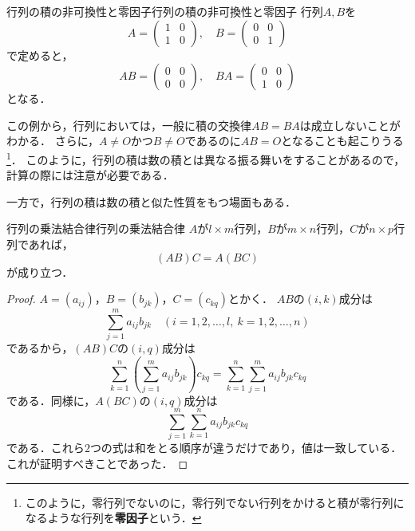 \begin{example}{行列の積の非可換性と零因子}{行列の積の非可換性と零因子}
  行列$A,B$を
  \[
    A = \begin{pmatrix} 1 & 0 \\ 1 & 0 \end{pmatrix}, \quad
    B = \begin{pmatrix} 0 & 0 \\ 0 & 1 \end{pmatrix}
  \]
  で定めると，
  \[
    AB = \begin{pmatrix} 0 & 0 \\ 0 & 0 \end{pmatrix}, \quad
    BA = \begin{pmatrix} 0 & 0 \\ 1 & 0 \end{pmatrix}
  \]
  となる．
\end{example}

この例から，行列においては，一般に積の交換律$AB = BA$は成立しないことがわかる．
さらに，$A \ne O$かつ$B \ne O$であるのに$AB = O$となることも起こりうる\footnote{このように，零行列でないのに，零行列でない行列をかけると積が零行列になるような行列を\textbf{零因子}という．}．
このように，行列の積は数の積とは異なる振る舞いをすることがあるので，計算の際には注意が必要である．

一方で，行列の積は数の積と似た性質をもつ場面もある．

\begin{prop}{行列の乗法結合律}{行列の乗法結合律}
  $A$が$l \times m$行列，$B$が$m \times n$行列，$C$が$n \times p$行列であれば，
  \[
    (AB)C = A(BC)
  \]
  が成り立つ．
\end{prop}

\begin{tleftbar}
\begin{proof}
  $A = (a_{ij})$，$B = (b_{jk})$，$C = (c_{kq})$とかく．
  $AB$の$(i, k)$成分は
  \[
    \sum_{j=1}^{m} a_{ij} b_{jk}
    \quad (i = 1, 2, \dots, l,~ k = 1, 2, \dots, n)
  \]
  であるから，$(AB)C$の$(i, q)$成分は
  \[
    \sum_{k=1}^{n} \left( \sum_{j=1}^{m} a_{ij} b_{jk} \right) c_{kq}
    = \sum_{k=1}^{n} \sum_{j=1}^{m} a_{ij} b_{jk} c_{kq}
  \]
  である．同様に，$A(BC)$の$(i, q)$成分は
  \[
    \sum_{j=1}^{m} \sum_{k=1}^{n} a_{ij} b_{jk} c_{kq}
  \]
  である．これら$2$つの式は和をとる順序が違うだけであり，値は一致している．
  これが証明すべきことであった．
\end{proof}
\end{tleftbar}

